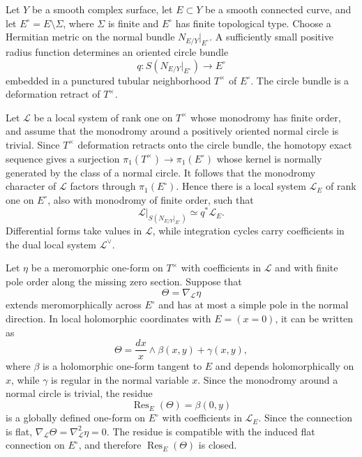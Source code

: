 \documentclass[12pt]{amsart}
\numberwithin{equation}{section}
\theoremstyle{plain}
\theoremstyle{definition}
\theoremstyle{remark}
\theoremstyle{definition}
\DeclareMathOperator{\Res}{Res}
\newcommand{\Lcal}{\mathscr L}
\begin{document}
Let $Y$ be a smooth complex surface, let $E\subset Y$ be a smooth connected curve, and let $E^\circ=E\setminus \Sigma$, where $\Sigma$ is finite and $E^\circ$ has finite topological type. Choose a Hermitian metric on the normal bundle $N_{E/Y}|_{E^\circ}$. A sufficiently small positive radius function determines an oriented circle bundle
\begin{equation*}
q:S(N_{E/Y}|_{E^\circ})\to  E^\circ
\end{equation*}
embedded in a punctured tubular neighborhood $T^\times$ of $E^\circ$. The circle bundle is a deformation retract of $T^\times$.

Let $\Lcal$ be a local system of rank one on $T^\times$ whose monodromy has finite order, and assume that the monodromy around a positively oriented normal circle is trivial. Since $T^\times$ deformation retracts onto the circle bundle, the homotopy exact sequence gives a surjection $\pi_1(T^\times)\to\pi_1(E^\circ)$ whose kernel is normally generated by the class of a normal circle. It follows that the monodromy character of $\Lcal$ factors through $\pi_1(E^\circ)$. Hence there is a local system $\Lcal_E$ of rank one on $E^\circ$, also with monodromy of finite order, such that
\begin{equation}\label{eq:tube-system-pullback}
\Lcal|_{S(N_{E/Y}|_{E^\circ})}\simeq q^*\Lcal_E.
\end{equation}
Differential forms take values in $\Lcal$, while integration cycles carry coefficients in the dual local system $\Lcal^\vee$.

Let $\eta$ be a meromorphic one-form on $T^\times$ with coefficients in $\Lcal$ and with finite pole order along the missing zero section. Suppose that
\begin{equation*}
\Theta=\nabla_{\Lcal}\eta
\end{equation*}
extends meromorphically across $E^\circ$ and has at most a simple pole in the normal direction. In local holomorphic coordinates with $E=(x=0)$, it can be written as
\begin{equation}\label{eq:simple-normal-pole}
\Theta=\frac{dx}{x}\wedge\beta(x,y)+\gamma(x,y),
\end{equation}
where $\beta$ is a holomorphic one-form tangent to $E$ and depends holomorphically on $x$, while $\gamma$ is regular in the normal variable $x$. Since the monodromy around a normal circle is trivial, the residue
\begin{equation}\label{eq:residue-of-theta}
\Res_E(\Theta)=\beta(0,y)
\end{equation}
is a globally defined one-form on $E^\circ$ with coefficients in $\Lcal_E$. Since the connection is flat, $\nabla_{\Lcal}\Theta=\nabla_{\Lcal}^2\eta=0$. The residue is compatible with the induced flat connection on $E^\circ$, and therefore $\Res_E(\Theta)$ is closed.
\end{document}
